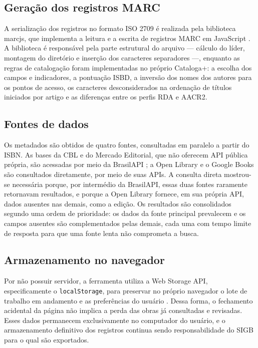 \subsection{Geração dos registros MARC}
\label{subsec:marcjs}

A serialização dos registros no formato ISO 2709 é realizada pela biblioteca marcjs, que implementa a leitura e a escrita de registros MARC em JavaScript \cite{marcjs}. A biblioteca é responsável pela parte estrutural do arquivo --- cálculo do líder, montagem do diretório e inserção dos caracteres separadores ---, enquanto as regras de catalogação foram implementadas no próprio Cataloga+: a escolha dos campos e indicadores, a pontuação ISBD, a inversão dos nomes dos autores para os pontos de acesso, os caracteres desconsiderados na ordenação de títulos iniciados por artigo e as diferenças entre os perfis RDA e AACR2.

\subsection{Fontes de dados}
\label{subsec:apis}

Os metadados são obtidos de quatro fontes, consultadas em paralelo a partir do ISBN. As bases da CBL e do Mercado Editorial, que não oferecem API pública própria, são acessadas por meio da BrasilAPI \cite{brasilapi}; a Open Library \cite{openlibrary} e o Google Books \cite{googlebooks} são consultados diretamente, por meio de suas APIs. A consulta direta mostrou-se necessária porque, por intermédio da BrasilAPI, essas duas fontes raramente retornavam resultados, e porque a Open Library fornece, em sua própria API, dados ausentes nas demais, como a edição. Os resultados são consolidados segundo uma ordem de prioridade: os dados da fonte principal prevalecem e os campos ausentes são complementados pelas demais, cada uma com tempo limite de resposta para que uma fonte lenta não comprometa a busca.

\subsection{Armazenamento no navegador}
\label{subsec:storage}

Por não possuir servidor, a ferramenta utiliza a Web Storage API, especificamente o \texttt{localStorage}, para preservar no próprio navegador o lote de trabalho em andamento e as preferências do usuário \cite{mdnstorage}. Dessa forma, o fechamento acidental da página não implica a perda das obras já consultadas e revisadas. Esses dados permanecem exclusivamente no computador do usuário, e o armazenamento definitivo dos registros continua sendo responsabilidade do SIGB para o qual são exportados.
